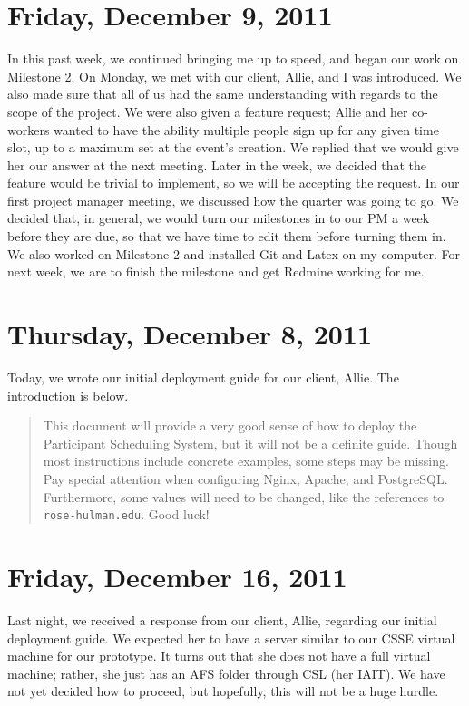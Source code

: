 \documentclass{article}
\begin{document}
\section{Friday, December 9, 2011} %
In this past week, we continued bringing me up to speed, and began our work on
Milestone 2. On Monday, we met with our client, Allie, and I was introduced. We also
made sure that all of us had the same understanding with regards to the scope of the
project. We were also given a feature request; Allie and her co-workers wanted to have
the ability multiple people sign up for any given time slot, up to a maximum set at
the event's creation. We replied that we would give her our answer at the next
meeting. Later in the week, we decided that the feature would be trivial to implement,
so we will be accepting the request. In our first project manager meeting, we discussed
how the quarter was going to go. We decided that, in general, we would turn our
milestones in to our PM a week before they are due, so that we have time to edit them
before turning them in. We also worked on Milestone 2 and installed Git and Latex on
my computer. For next week, we are to finish the milestone and get Redmine working for
me.

\section{Thursday, December 8, 2011} %
Today, we wrote our initial deployment guide for our client, Allie. The
introduction is below.
\begin{quote}
This document will provide a very good sense of how to deploy the Participant
Scheduling System, but it will not be a definite guide. Though most instructions
include concrete examples, some steps may be missing. Pay special attention
when configuring Nginx, Apache, and PostgreSQL. Furthermore, some values will
need to be changed, like the references to \verb#rose-hulman.edu#. Good luck!
\end{quote}

\section{Friday, December 16, 2011} %
Last night, we received a response from our client, Allie, regarding our
initial deployment guide. We expected her to have a server similar to our
CSSE virtual machine for our prototype. It turns out that she does not
have a full virtual machine; rather, she just has an AFS folder through
CSL (her IAIT). We have not yet decided how to proceed, but hopefully,
this will not be a huge hurdle.
\end{document}
